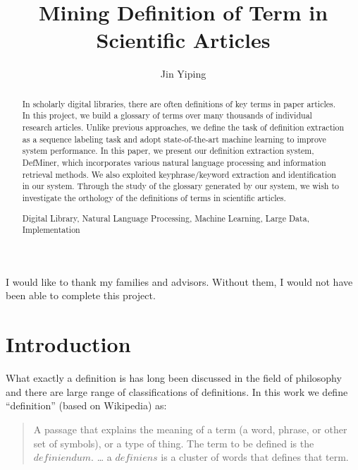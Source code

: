 \documentclass[hyp]{socreport}
\begin{document}
\title{Mining Definition of Term in Scientific Articles}
\author{Jin Yiping}
\maketitle
\begin{abstract}
In scholarly digital libraries, there are often definitions of key terms in paper articles. In this project, we build a glossary of terms over many thousands of individual research articles. Unlike previous approaches, we define the task of definition extraction as a sequence labeling task and adopt state-of-the-art machine learning to improve system performance. In this paper, we present our definition extraction system, DefMiner, which incorporates various natural language processing and information retrieval methods. We also exploited keyphrase/keyword extraction and identification in our system. Through the study of the glossary generated by our system, we wish to investigate the orthology of the definitions of terms in scientific articles.

\begin{keywords}
	Digital Library, Natural Language Processing, Machine Learning, Large Data, Implementation
\end{keywords}

\end{abstract}

\begin{acknowledgement}
   I would like to thank my families and advisors.
   Without them, I would not have been able to complete this project.
\end{acknowledgement}

\listoffigures 
\listoftables
\tableofcontents 

\chapter{Introduction}
What exactly a definition is has long been discussed in the field of philosophy and there are large range of classifications of definitions. In this work we define ``definition'' (based on Wikipedia) as: 
\begin{quotation}
\noindent
A passage that explains the meaning of a term (a word, phrase, or other set of symbols), or a type of thing. The term to be defined is the $definiendum$. … a $definiens$ is a cluster of words that defines that term.
\end{quotation}
\end{document}
